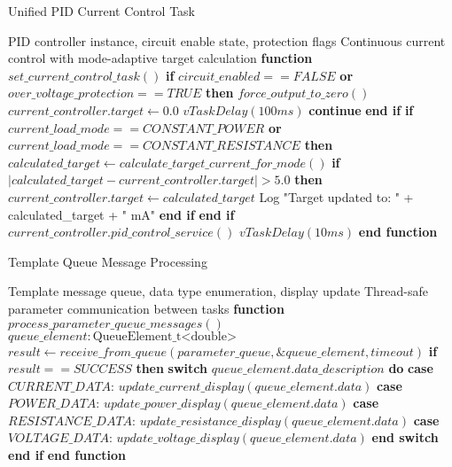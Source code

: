 \documentclass{article}
\begin{document}
\begin{algorithm}
\caption{Unified PID Current Control Task}
\label{alg:unified_pid_control}
\begin{algorithmic}[1]
\REQUIRE PID controller instance, circuit enable state, protection flags
\ENSURE Continuous current control with mode-adaptive target calculation
\STATE \textbf{function} $set\_current\_control\_task()$
    \STATE \textbf{if} $circuit\_enabled == FALSE$ \textbf{or} $over\_voltage\_protection == TRUE$ \textbf{then}
    \STATE \quad $force\_output\_to\_zero()$ 
    \STATE \quad $current\_controller.target \leftarrow 0.0$
    \STATE \quad $vTaskDelay(100ms)$
    \STATE \quad \textbf{continue}
    \STATE \textbf{end if}
    \STATE
    \STATE \textbf{if} $current\_load\_mode == CONSTANT\_POWER$ \textbf{or} $current\_load\_mode == CONSTANT\_RESISTANCE$ \textbf{then}
    \STATE \quad $calculated\_target \leftarrow calculate\_target\_current\_for\_mode()$
    \STATE \quad \textbf{if} $|calculated\_target - current\_controller.target| > 5.0$ \textbf{then} 
    \STATE \quad \quad $current\_controller.target \leftarrow calculated\_target$
    \STATE \quad \quad Log "Target updated to: " + calculated\_target + " mA"
    \STATE \quad \textbf{end if}
    \STATE \textbf{end if}
    \STATE {}
    \STATE
    \STATE $current\_controller.pid\_control\_service()$ 
    \STATE $vTaskDelay(10ms)$ 
\ENDWHILE
\STATE \textbf{end function}
\end{algorithmic}
\end{algorithm}

\begin{algorithm}
\caption{Template Queue Message Processing}
\label{alg:template_queue_processing}
\begin{algorithmic}[1]
\REQUIRE Template message queue, data type enumeration, display update
\ENSURE Thread-safe parameter communication between tasks
\STATE \textbf{function} $process\_parameter\_queue\_messages()$
\STATE $queue\_element: \text{QueueElement\_t<double>}$
    \STATE $result \leftarrow receive\_from\_queue(parameter\_queue, \&queue\_element, timeout)$
    \STATE \textbf{if} $result == SUCCESS$ \textbf{then}
    \STATE \quad \textbf{switch} $queue\_element.data\_description$ \textbf{do}
    \STATE \quad \textbf{case} $CURRENT\_DATA$:
    \STATE \quad \quad $update\_current\_display(queue\_element.data)$
    \STATE \quad \textbf{case} $POWER\_DATA$:
    \STATE \quad \quad $update\_power\_display(queue\_element.data)$
    \STATE \quad \textbf{case} $RESISTANCE\_DATA$:
    \STATE \quad \quad $update\_resistance\_display(queue\_element.data)$
    \STATE \quad \textbf{case} $VOLTAGE\_DATA$:
    \STATE \quad \quad $update\_voltage\_display(queue\_element.data)$
    \STATE \quad \textbf{end switch}
    \STATE \textbf{end if}
\ENDWHILE
\STATE \textbf{end function}
\end{algorithmic}
\end{algorithm}
\end{document}
